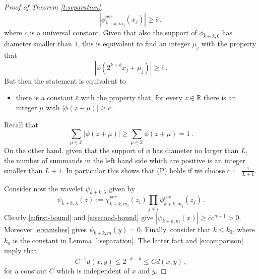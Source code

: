 \documentclass[11pt,reqno]{amsart}
\theoremstyle{definition}
\numberwithin{equation}{section}
\begin{document}
\begin{proof}[Proof of Theorem \ref{t:separation}]
\begin{equation}\label{e:second-bound}
|\phi^{per}_{\bar{k}+k, m_j} (x_j)|\geq \bar{c}\, ,
\end{equation}
where $\bar{c}$ is a universal constant. Given that also the support of $\phi_{\bar{k}+k,0}$ has diameter smaller than $1$, this is equivalent to find an integer $\mu_j$ with the property that 
\[
|\phi (2^{\bar{k}+k} x_j + \mu_j)|\geq \bar{c}\, .
\]
But then the statement is equivalent to 
\begin{itemize}
\item[(P)] there is a constant $\bar{c}$ with the property that, for every $z\in \mathbb R$ there is an integer $\mu$ with $|\phi (z+\mu)|\geq \bar{c}$.  
\end{itemize}
Recall that 
\[
\sum_{\mu \in \mathbb Z} |\phi (z+\mu)| \geq \sum_{\mu \in \mathbb Z} \phi (z+\mu) = 1\, .
\]
On the other hand, given that the support of $\phi$ has diameter no larger than $L$, the number of summands in the left hand side which are positive is an integer smaller than $L+1$. In particular this shows that (P) holds if we choose $\bar{c} := \frac{1}{L+1}$. 

Consider now the wavelet $\psi_{\bar{k}+k, \lambda}$ given by 
\[
\psi_{\bar{k}+k, \lambda} (z) := \chi^{per}_{\bar{k}+k, m_i} (z_i) \prod_{j\neq i} \phi^{per}_{\bar{k}+k, m_j} (z_j)\, .
\]
Clearly \eqref{e:first-bound} and \eqref{e:second-bound} give $|\psi_{\bar{k}+k, m} (x)| \geq \bar{c} c^{n-1} >0$. Moreover \eqref{e:vanishes} gives $\psi_{\bar{k}+k, m} (y)= 0$. Finally, consider that $k\leq k_0$, where $k_0$ is the constant in Lemma \ref{l:separation}. The latter fact and \eqref{e:comparison} imply that 
\[
C^{-1} d(x,y) \leq 2^{-\bar{k}-k} \leq C d (x,y)\, ,
\]
for a constant $C$ which is independent of $x$ and $y$. 
\end{proof}
\end{document}
